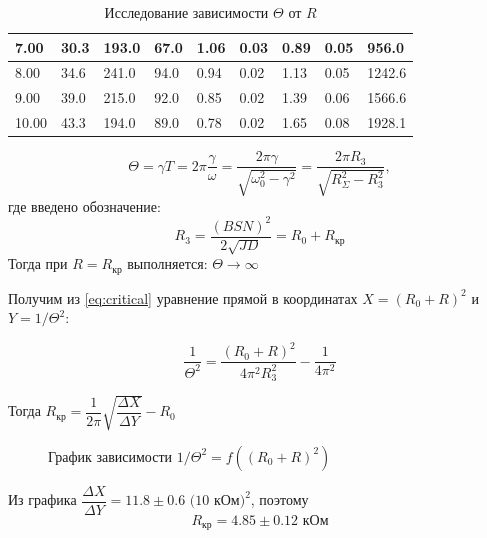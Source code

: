 \documentclass[a4paper, 12pt]{article}
\begin{document}
\begin{table}[H]
{\begin{tabular}{|l|l|l|l|l|l|l|l|l|}
7.00                      & 30.3                      & 193.0              & 67.0                   & 1.06              & 0.03                 & 0.89                  & 0.05                                   & 956.0                              \\ \hline
8.00                      & 34.6                      & 241.0              & 94.0                   & 0.94              & 0.02                 & 1.13                  & 0.05                                   & 1242.6                             \\ \hline
9.00                      & 39.0                      & 215.0              & 92.0                   & 0.85              & 0.02                 & 1.39                  & 0.06                                   & 1566.6                             \\ \hline
10.00                     & 43.3                      & 194.0              & 89.0                   & 0.78              & 0.02                 & 1.65                  & 0.08                                   & 1928.1                             \\ \hline
\end{tabular}%
}
\caption{Исследование зависимости $\Theta$ от $R$}
\label{my-label}
\end{table}

\begin{equation}
\Theta = \gamma T = 2 \pi \dfrac{\gamma}{\omega} = \dfrac{2 \pi \gamma}{\sqrt{\omega_0^2 - \gamma^2}} = \dfrac{2 \pi R_3}{\sqrt{R_\Sigma^2 - R_3^2}},
\label{eq:critical}
\end{equation}
где введено обозначение:
$$R_3 = \frac{(BSN)^2}{2\sqrt{JD}} = R_0 + R_\text{кр}$$
Тогда при $R = R_\text{кр}$  выполняется: $\Theta \rightarrow \infty$

Получим из \ref{eq:critical} уравнение прямой в координатах $X = (R_0 + R)^2$ и $Y = 1/\Theta^2$:

$$\dfrac{1}{\Theta^2} = \dfrac{(R_0 + R)^2}{4 \pi^2 R_3^2} - \dfrac{1}{4 \pi^2}$$

Тогда $R_\text{кр} = \dfrac{1}{2 \pi} \sqrt{\dfrac{\Delta X}{\Delta Y}} - R_0$

\begin {figure}[H]
	\begin{center}

		\caption{График зависимости $1/\Theta^2 = f((R_0 + R)^2)$}
	\end{center}
\end {figure}


Из графика $\dfrac{\Delta X}{\Delta Y} = 11.8 \pm 0.6 \text{ (10 кОм)}^2$, поэтому 
$$R_\text{кр} = 4.85 \pm 0.12 \text{  кОм}$$
\end{document}

